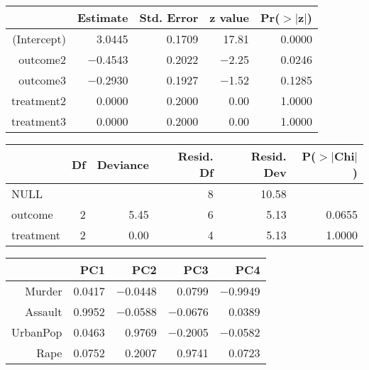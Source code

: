 \documentclass{article}
\begin{document}
\begin{table}[ht]
\begin{center}
\begin{tabular}{rrrrr}
\hline
 & Estimate & Std. Error & z value & Pr($>$$|$z$|$) \\
\hline
(Intercept) & 3.0445 & 0.1709 & 17.81 & 0.0000 \\
outcome2 & $-$0.4543 & 0.2022 & $-$2.25 & 0.0246 \\
outcome3 & $-$0.2930 & 0.1927 & $-$1.52 & 0.1285 \\
treatment2 & 0.0000 & 0.2000 & 0.00 & 1.0000 \\
treatment3 & 0.0000 & 0.2000 & 0.00 & 1.0000 \\
\hline
\end{tabular}
\end{center}
\end{table}
\begin{table}[ht]
\begin{center}
\begin{tabular}{lrrrrr}
\hline
 & Df & Deviance & Resid. Df & Resid. Dev & P($>$$|$Chi$|$) \\
\hline
NULL &  &  & 8 & 10.58 &  \\
outcome & 2 & 5.45 & 6 & 5.13 & 0.0655 \\
treatment & 2 & 0.00 & 4 & 5.13 & 1.0000 \\
\hline
\end{tabular}
\end{center}
\end{table}
\begin{table}[ht]
\begin{center}
\begin{tabular}{rrrrr}
\hline
 & PC1 & PC2 & PC3 & PC4 \\
\hline
Murder & 0.0417 & $-$0.0448 & 0.0799 & $-$0.9949 \\
Assault & 0.9952 & $-$0.0588 & $-$0.0676 & 0.0389 \\
UrbanPop & 0.0463 & 0.9769 & $-$0.2005 & $-$0.0582 \\
Rape & 0.0752 & 0.2007 & 0.9741 & 0.0723 \\
\hline
\end{tabular}
\end{center}
\end{table}
\end{document}
